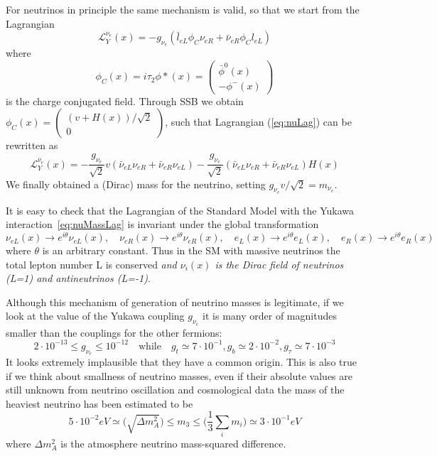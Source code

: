 \documentclass{subnucbo}
\begin{document}
For neutrinos in principle the same mechanism is valid, so that we start from the Lagrangian
\begin{equation}
\label{eq:nuLag}
\mathcal{L}_Y^{\nu_e}(x)=-g_{\nu_e}(\bar{l}_{eL}\phi_C \nu_{eR}+\bar{\nu}_{eR}\phi_C l_{eL})
\end{equation}
where
\begin{equation}
\phi_C(x)=i\tau_2\phi*(x)=\begin{pmatrix}\bar{\phi}^0(x) \\ -\phi^-(x)\end{pmatrix}
\end{equation}
is the charge conjugated field. Through SSB we obtain $\phi_C(x)=\begin{pmatrix}(v+H(x))/\sqrt{2}\\0\end{pmatrix}$, such that Lagrangian (\ref{eq:nuLag}) can be rewritten as
\begin{equation}
\label{eq:nuMassLag}
\mathcal{L}_Y^{\nu_e}(x)=-\frac{g_{\nu_e}}{\sqrt{2}}v(\bar{\nu}_{eL}\nu_{eR}+\bar{\nu}_{eR}\nu_{eL})-\frac{g_{\nu_e}}{\sqrt{2}}(\bar{\nu}_{eL}\nu_{eR}+\bar{\nu}_{eR}\nu_{eL})H(x)
\end{equation}
We finally obtained a (Dirac) mass for the neutrino, setting $g_{\nu_e}v/\sqrt{2}=m_{\nu_e}$.

It is easy to check that the Lagrangian of the Standard Model with the Yukawa interaction~\ref{eq:nuMassLag} is invariant under the global transformation
\[
\nu_{eL}(x)\rightarrow e^{i\theta}\nu_{eL}(x),\quad\nu_{eR}(x)\rightarrow e^{i\theta}\nu_{eR}(x),
\quad e_L(x)\rightarrow e^{i\theta}e_L(x),\quad e_R(x)\rightarrow e^{i\theta}e_R(x)
\]
where $\theta$ is an arbitrary constant. Thus in the SM with massive neutrinos the total lepton number L is conserved  \emph{and $\nu_i(x)$ is the Dirac field of neutrinos (L=1) and antineutrinos (L=-1)}.

Although this mechanism of generation of neutrino masses is legitimate, if we look at the value of the Yukawa coupling $g_{\nu_e}$ it is many order of magnitudes smaller than the couplings for the other fermions:%
\[
2\cdot10^{-13}\leq g_{\nu_e}\leq10^{-12} \quad \text{while}\quad g_t\simeq7\cdot10^{-1}, g_b\simeq2\cdot10^{-2}, g_{\tau}\simeq7\cdot10^{-3}
\]
It looks extremely implausible that they have a common origin. This is also true if we think about smallness of neutrino masses, even if their absolute values are still unknown from neutrino oscillation and cosmological data the mass of the heaviest neutrino has been estimated to be
\[
5\cdot10^{-2}eV\simeq\biggl(\sqrt{\Delta m^2_A}\biggr)\leq m_3\leq\biggl(\frac{1}{3}\sum_im_i\biggr)\simeq3\cdot10^{-1}eV
\]
where $\Delta m^2_A$ is the atmosphere neutrino mass-squared difference.
\end{document}
